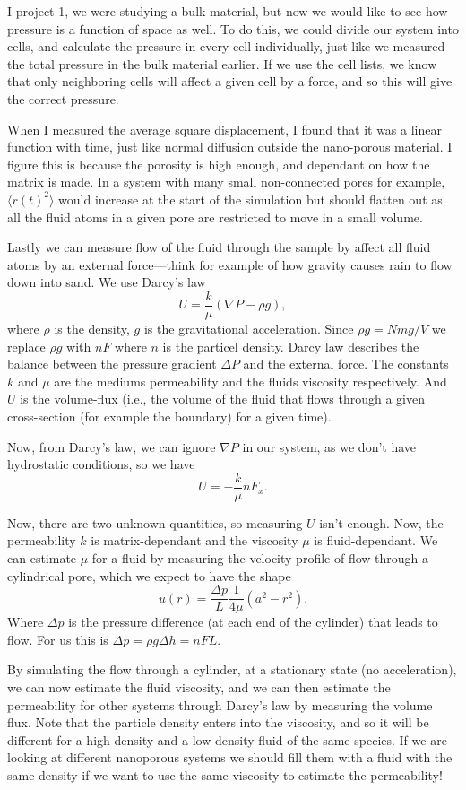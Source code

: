 \documentclass[a4paper, 11pt, notitlepage, english]{article}
\begin{document}
I project 1, we were studying a bulk material, but now we would like to see how pressure is a function of space as well. To do this, we could divide our system into cells, and calculate the pressure in every cell individually, just like we measured the total pressure in the bulk material earlier. If we use the cell lists, we know that only neighboring cells will affect a given cell by a force, and so this will give the correct pressure.

When I measured the average square displacement, I found that it was a linear function with time, just like normal diffusion outside the nano-porous material. I figure this is because the porosity is high enough, and dependant on how the matrix is made. In a system with many small non-connected pores for example, $\langle r(t)^2 \rangle$ would increase at the start of the simulation but should flatten out as all the fluid atoms in a given pore are restricted to move in a small volume.

Lastly we can measure flow of the fluid through the sample by affect all fluid atoms by an external force---think for example of how gravity causes rain to flow down into sand. We use Darcy's law
$$U = \frac{k}{\mu}(\nabla P - \rho g),$$
where $\rho$ is the density, $g$ is the gravitational acceleration. Since $\rho g = Nmg/V$ we replace $\rho g$ with $nF$ where $n$ is the particel density. Darcy law describes the balance between the pressure gradient $\Delta P$ and the external force. The constants $k$ and $\mu$ are the mediums permeability and the fluids viscosity respectively. And $U$ is the volume-flux (i.e., the volume of the fluid that flows through a given cross-section (for example the boundary) for a given time).

Now, from Darcy's law, we can ignore $\nabla P$ in our system, as we don't have hydrostatic conditions, so we have
$$U = -\frac{k}{\mu}nF_x.$$

Now, there are two unknown quantities, so measuring $U$ isn't enough. Now, the permeability $k$ is matrix-dependant and the viscosity $\mu$ is fluid-dependant. We can estimate $\mu$ for a fluid by measuring the velocity profile of flow through a cylindrical pore, which we expect to have the shape
$$u(r) = \frac{\Delta p}{L} \frac{1}{4\mu}(a^2 - r^2).$$
Where $\Delta p$ is the pressure difference (at each end of the cylinder) that leads to flow. For us this is $\Delta p = \rho g \Delta h = nFL$. 

By simulating the flow through a cylinder, at a stationary state (no acceleration), we can now estimate the fluid viscosity, and we can then estimate the permeability for other systems through Darcy's law by measuring the volume flux. Note that the particle density enters into the viscosity, and so it will be different for a high-density and a low-density fluid of the same species. If we are looking at different nanoporous systems we should fill them with a fluid with the same density if we want to use the same viscosity to estimate the permeability!
\end{document}
